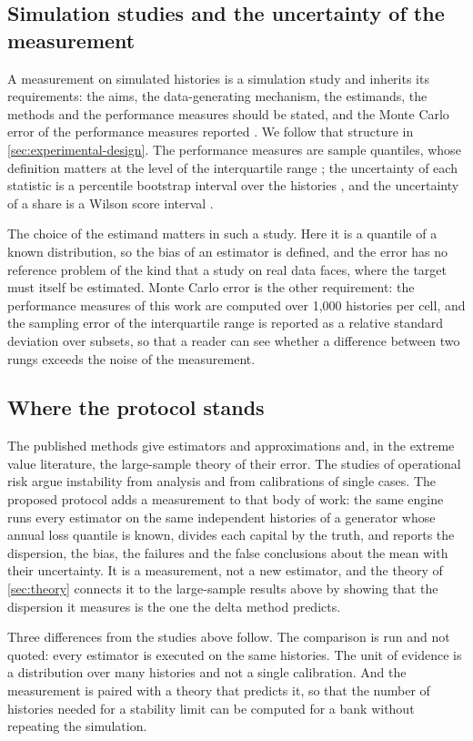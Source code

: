 \subsection{Simulation studies and the uncertainty of the measurement}
\label{sec:rw-simulation}

A measurement on simulated histories is a simulation study and inherits its requirements: the aims, the data-generating mechanism, the estimands, the methods and the performance measures should be stated, and the Monte Carlo error of the performance measures reported \citep{morris2019}. We follow
that structure in \cref{sec:experimental-design}. The performance measures are sample quantiles, whose definition matters at the level of the interquartile range \citep{hyndman1996}; the uncertainty of each statistic is a percentile bootstrap interval over the histories \citep{efron1979,diciccio1996}, and the uncertainty of a share is a Wilson score interval \citep{wilson1927}.

The choice of the estimand matters in such a study. Here it is a quantile of a known distribution, so the bias of an estimator is defined, and the error has no reference problem of the kind that a study on real data faces, where the target must itself be estimated. Monte Carlo error is the other requirement: the performance measures of this work are computed over 1{,}000 histories per cell, and the sampling error of the interquartile range is reported as a relative standard deviation over subsets, so that a reader can see whether a difference between two rungs exceeds the noise of the measurement.

\subsection{Where the protocol stands}
\label{sec:rw-position}

The published methods give estimators and approximations and, in the extreme value literature, the large-sample theory of their error. The studies of operational risk argue instability from analysis and from calibrations of single cases. The proposed protocol adds a measurement to that body of work:
the same engine runs every estimator on the same independent histories of a generator whose annual loss quantile is known, divides each capital by the truth, and reports the dispersion, the bias, the failures and the false conclusions about the mean with their uncertainty. It is a measurement, not a new estimator, and the theory of \cref{sec:theory}
connects it to the large-sample results above by showing that the dispersion it measures is the one the delta method predicts.

Three differences from the studies above follow. The comparison is run and not quoted: every estimator is executed on the same histories. The unit of evidence is a distribution over many histories and not a single calibration. And the measurement is paired with a theory that predicts it, so that the number of histories needed for a stability limit can be computed for a bank without repeating the simulation.
